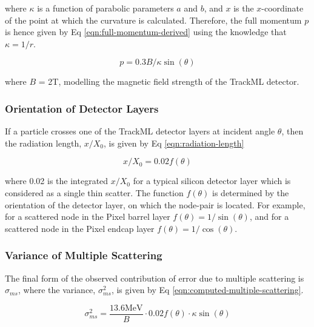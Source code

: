 where $\kappa$ is a function of parabolic parameters $a$ and $b$, and $x$ is the $x$-coordinate of the point at which the curvature is calculated. Therefore, the full momentum $p$ is hence given by Eq \eqref{eqn:full-momentum-derived} using the knowledge that $\kappa = 1/r$.

\begin{equation}
p = 0.3 B / \kappa \sin(\theta)
\label{eqn:full-momentum-derived}
\end{equation}

where $B$ = 2T, modelling the magnetic field strength of the TrackML detector.

\subsubsection{Orientation of Detector Layers}

If a particle crosses one of the TrackML detector layers at incident angle $\theta$, then the radiation length, $x/X_0$, is given by Eq \eqref{eqn:radiation-length}

\begin{equation}
x/X_0 = 0.02 f(\theta)
\label{eqn:radiation-length}
\end{equation}

where 0.02 is the integrated $x/X_0$ for a typical silicon detector layer which is considered as a single thin scatter. The function $f(\theta)$ is determined by the orientation of the detector layer, on which the node-pair is located. For example, for a scattered node in the Pixel barrel layer $f(\theta) = 1 / \sin(\theta)$, and for a scattered node in the Pixel endcap layer $f(\theta) = 1 / \cos(\theta)$.




\subsubsection{Variance of Multiple Scattering}

The final form of the observed contribution of error due to multiple scattering is $\sigma_{ms}$, where the variance, $\sigma_{ms}^2$, is given by Eq \eqref{eqn:computed-multiple-scattering}.

\begin{equation}
    \sigma_{ms}^{2} = \frac{13.6 \text{MeV}}{B} \cdot 0.02 f(\theta) \cdot \kappa \sin(\theta)
    \label{eqn:computed-multiple-scattering}
\end{equation}



